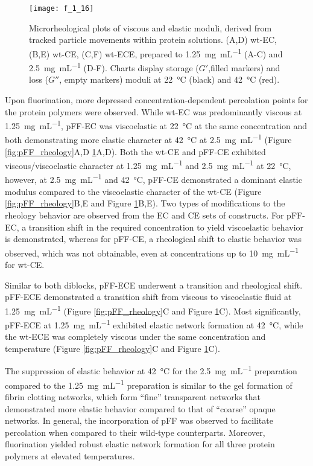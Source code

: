\begin{refsection}
\begin{figure}[h!] \centering \texttt{[image: f\_1\_16]}
    \caption{Microrheological plots of viscous and elastic moduli, derived from
    tracked particle movements within protein solutions. (A,D) wt-EC, (B,E)
    wt-CE, (C,F) wt-ECE, prepared to \SI{1.25}{\mg\per\mL} (A-C) and
    \SI{2.5}{\mg\per\mL} (D-F). Charts display storage (${G'}$,filled markers) and loss
    (${G''}$, empty markers) moduli at \SI{22}{\celsius} (black) and \SI{42}{\celsius}
(red).} \label{fig:wt_rheology} \end{figure}
Upon fluorination, more depressed concentration-dependent percolation points for
the protein polymers were observed. While wt-EC was predominantly viscous at
\SI{1.25}{\mg\per\mL}, pFF-EC was viscoelastic at \SI{22}{\celsius} at the same
concentration and both demonstrating more elastic character at \SI{42}{\celsius}
at \SI{2.5}{\mg\per\mL} (Figure \ref{fig:pFF_rheology}A,D
\ref{fig:wt_rheology}A,D). Both the wt-CE and pFF-CE exhibited
viscous/viscoelastic character at \SI{1.25}{\mg\per\mL} and \SI{2.5}{\mg\per\mL}
at \SI{22}{\celsius}, however, at \SI{2.5}{\mg\per\mL} and \SI{42}{\celsius},
pFF-CE demonstrated a dominant elastic modulus compared to the viscoelastic
character of the wt-CE (Figure \ref{fig:pFF_rheology}B,E and Figure
\ref{fig:wt_rheology}B,E). Two types of modifications to the rheology behavior
are observed from the EC and CE sets of constructs. For pFF-EC, a transition
shift in the required concentration to yield viscoelastic behavior is
demonstrated, whereas for pFF-CE, a rheological shift to elastic behavior was
observed, which was not obtainable, even at concentrations up to
\SI{10}{\mg\per\mL} for wt-CE.\cite{Haghpanah2010}

Similar to both diblocks, pFF-ECE underwent a transition and rheological shift.
pFF-ECE demonstrated a transition shift from viscous to viscoelastic fluid at
\SI{1.25}{\mg\per\mL} (Figure \ref{fig:pFF_rheology}C and Figure
\ref{fig:wt_rheology}C). Most significantly, pFF-ECE at
\SI{1.25}{\mg\per\mL} exhibited elastic network formation at
\SI{42}{\celsius}, while the wt-ECE was completely viscous under the same
concentration and temperature (Figure \ref{fig:pFF_rheology}C and Figure
\ref{fig:wt_rheology}C).

The suppression of elastic behavior at \SI{42}{\celsius} for the
\SI{2.5}{\mg\per\mL} preparation compared to the \SI{1.25}{\mg\per\mL}
preparation is similar to the gel formation of fibrin clotting networks, which
form ``fine'' transparent networks that demonstrated more elastic behavior
compared to that of ``coarse'' opaque networks. In general, the
incorporation of pFF was observed to facilitate percolation when compared to
their wild-type counterparts. Moreover, fluorination yielded robust elastic
network formation for all three protein polymers at elevated temperatures. 


\end{refsection}
